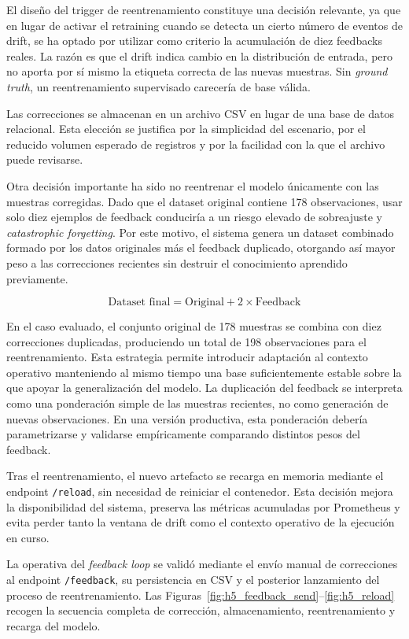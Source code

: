 El diseño del trigger de reentrenamiento constituye una decisión relevante, ya que en lugar de activar el retraining cuando se detecta un cierto número de eventos de drift, se ha optado por utilizar como criterio la acumulación de diez feedbacks reales. La razón es que el drift indica cambio en la distribución de entrada, pero no aporta por sí mismo la etiqueta correcta de las nuevas muestras. Sin \textit{ground truth}, un reentrenamiento supervisado carecería de base válida.

Las correcciones se almacenan en un archivo CSV en lugar de una base de datos relacional. Esta elección se justifica por la simplicidad del escenario, por el reducido volumen esperado de registros y por la facilidad con la que el archivo puede revisarse. 

Otra decisión importante ha sido no reentrenar el modelo únicamente con las muestras corregidas. Dado que el dataset original contiene 178 observaciones, usar solo diez ejemplos de feedback conduciría a un riesgo elevado de sobreajuste y \textit{catastrophic forgetting}. Por este motivo, el sistema genera un dataset combinado formado por los datos originales más el feedback duplicado, otorgando así mayor peso a las correcciones recientes sin destruir el conocimiento aprendido previamente.

\[
\text{Dataset final} = \text{Original} + 2 \times \text{Feedback}
\]

En el caso evaluado, el conjunto original de 178 muestras se combina con diez correcciones duplicadas, produciendo un total de 198 observaciones para el reentrenamiento. Esta estrategia permite introducir adaptación al contexto operativo manteniendo al mismo tiempo una base suficientemente estable sobre la que apoyar la generalización del modelo. La duplicación del feedback se interpreta como una ponderación simple de las muestras recientes, no como generación de nuevas observaciones. En una versión productiva, esta ponderación debería parametrizarse y validarse empíricamente comparando distintos pesos del feedback.

Tras el reentrenamiento, el nuevo artefacto se recarga en memoria mediante el endpoint \texttt{/reload}, sin necesidad de reiniciar el contenedor. Esta decisión mejora la disponibilidad del sistema, preserva las métricas acumuladas por Prometheus y evita perder tanto la ventana de drift como el contexto operativo de la ejecución en curso.

La operativa del \textit{feedback loop} se validó mediante el envío manual de correcciones al endpoint \texttt{/feed\-back}, su persistencia en CSV y el posterior lanzamiento del proceso de reentrenamiento. Las Figuras~\ref{fig:h5_feedback_send}--\ref{fig:h5_reload} recogen la secuencia completa de corrección, almacenamiento, reentrenamiento y recarga del modelo.

